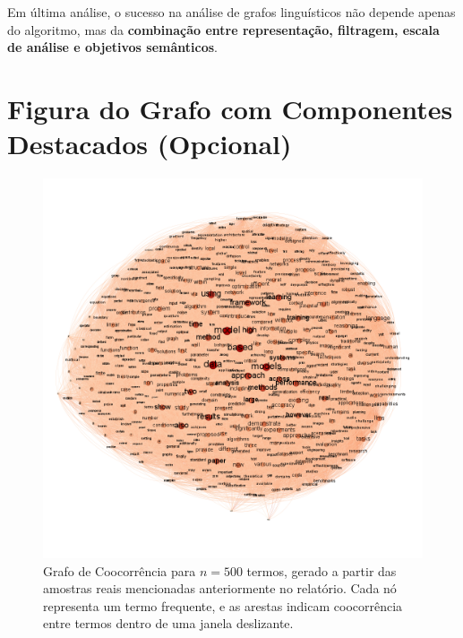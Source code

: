 \documentclass[12pt]{article}
\begin{document}
\medskip

Em última análise, o sucesso na análise de grafos linguísticos não depende apenas do algoritmo, mas da \textbf{combinação entre representação, filtragem, escala de análise e objetivos semânticos}.


\section{Figura do Grafo com Componentes Destacados (Opcional)}

\begin{figure}[H]
    \centering
    \includegraphics[width=1\textwidth]{grafo.png}
    \caption{Grafo de Coocorrência para $n = 500$ termos, gerado a partir das amostras reais mencionadas anteriormente no relatório. Cada nó representa um termo frequente, e as arestas indicam coocorrência entre termos dentro de uma janela deslizante.}
\end{figure}
\end{document}
